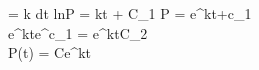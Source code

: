\int {} 
=
\int k \hspace{0.1cm} dt
\rightarrow
lnP = kt + C_1
\rightarrow
P = e^{kt+c_1}
\\
e^{kt}e^{c_1}
=
e^{kt}C_2 \\
\therefore P(t) = Ce^{kt}

